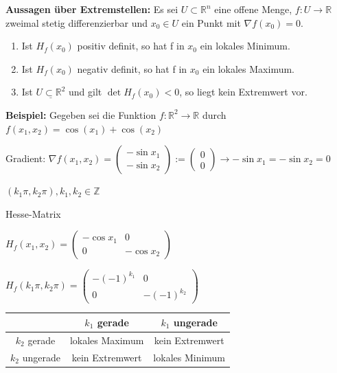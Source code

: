 \documentclass[fontset=ubuntu,12pt,a4paper,fleqn]{article}
\begin{document}
\textbf{Aussagen über Extremstellen:}
Es sei \(U\subset\mathbb{R}^n\) eine offene Menge, \(f:U\to\mathbb{R}\) zweimal stetig differenzierbar und \(x_0\in U\) ein Punkt mit \(\nabla f(x_0)=0\).
\begin{enumerate}
	\item Ist \(H_f(x_0)\) positiv definit, so hat f in \(x_0\) ein lokales Minimum.
	\item Ist \(H_f(x_0)\) negativ definit, so hat f in \(x_0\) ein lokales Maximum.
	\item Ist \(\underline{U\subset\mathbb{R}^2}\) und gilt \(\det H_f(x_0) < 0\), so liegt kein Extremwert vor.
\end{enumerate}

\textbf{Beispiel:}
Gegeben sei die Funktion \(f:\mathbb{R}^2\to\mathbb{R}\) durch \(f(x_1,x_2)=\cos(x_1)+\cos(x_2)\)

Gradient: \(\nabla f(x_1,x_2)=\begin{pmatrix}
-\sin x_1 \\ -\sin x_2
\end{pmatrix} := \begin{pmatrix}
0 \\ 0
\end{pmatrix} \to -\sin x_1 = -\sin x_2 = 0\)

\((k_1\pi,k_2\pi), k_1,k_2\in\mathbb{Z}\)
{\fontsize{9}{10}\begin{multicols}{2}
Hesse-Matrix

\(H_f(x_1,x_2)=\begin{pmatrix}
-\cos x_1 & 0 \\ 0 & -\cos x_2
\end{pmatrix}\)

\(H_f(k_1\pi,k_2\pi)=\begin{pmatrix}
-{(-1)}^{k_1} & 0 \\ 0 & -{(-1)}^{k_2} 
\end{pmatrix}\)

\vspace{1cm}
\def\arraystretch{1.25}	
\begin{tabular}{ c | c | c }
	& \(k_1\) gerade & \(k_1\) ungerade \\ \hline
	\(k_2\) gerade & lokales Maximum & kein Extremwert \\ \hline
	\(k_2\) ungerade & kein Extremwert & lokales Minimum \\ 
\end{tabular}
\end{multicols}}



    
\end{document}
